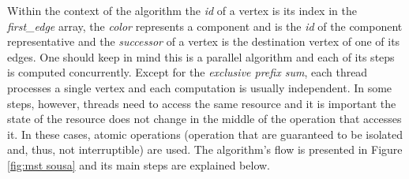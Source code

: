 Within the context of the algorithm the \emph{id} of a vertex is its index in the \emph{first\_edge} array, the \emph{color} represents a component and is the \emph{id} of the component representative and the \emph{successor} of a vertex is the destination vertex of one of its edges.
One should keep in mind this is a parallel algorithm and each of its steps is computed concurrently.
Except for the \emph{exclusive prefix sum}, each thread processes a single vertex and each computation is usually independent.
In some steps, however, threads need to access the same resource and it is important the state of the resource does not change in the middle of the operation that accesses it.
In these cases, atomic operations (operation that are guaranteed to be isolated and, thus, not interruptible) are used.
The algorithm's flow is presented in Figure \ref{fig:mst sousa} and its main steps are explained below.

